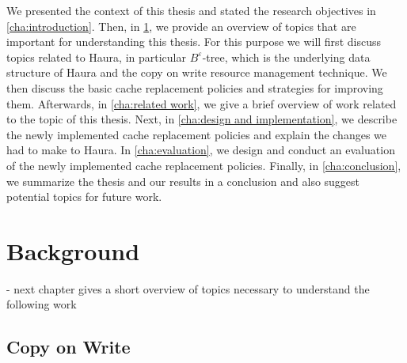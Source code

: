 \documentclass[
	12pt,
	a4paper,
	abstract,
	bibliography=totoc,
	chapterprefix,
	headings=openright,
	numbers=endperiod,
	parskip=half,
	twoside,
]{scrreprt}
\begin{document}
We presented the context of this thesis and stated the research objectives in \cref{cha:introduction}.
Then, in \cref{cha:background}, we provide an overview of topics that are important for understanding this thesis.
For this purpose we will first discuss topics related to Haura, in particular $B^{\varepsilon}$-tree,
which is the underlying data structure of Haura and the copy on write resource management technique.
We then discuss the basic cache replacement policies and strategies for improving them.
Afterwards, in \cref{cha:related work}, we give a brief overview of work related to the topic of this thesis.
Next, in \cref{cha:design and implementation}, we describe the newly implemented cache replacement policies 
and explain the changes we had to make to Haura.
In \cref{cha:evaluation}, we design and conduct an evaluation of the newly implemented cache replacement policies.
Finally, in \cref{cha:conclusion}, we summarize the thesis and our results in a conclusion and
 also suggest potential topics for future work.


\chapter{Background}
\label{cha:background}


- next chapter gives a short overview of topics necessary to understand the following work\\

\section{Copy on Write}
\label{sec:copy on write}
%
\end{document}
